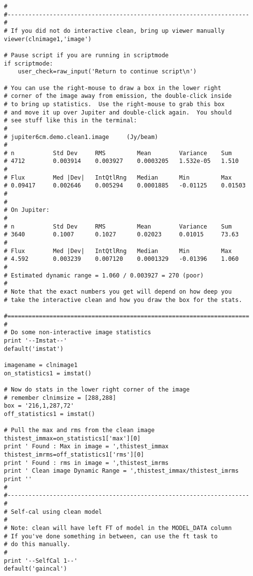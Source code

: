 \begin{verbatim}
#
#---------------------------------------------------------------------
#
# If you did not do interactive clean, bring up viewer manually
viewer(clnimage1,'image')

# Pause script if you are running in scriptmode
if scriptmode:
    user_check=raw_input('Return to continue script\n')

# You can use the right-mouse to draw a box in the lower right
# corner of the image away from emission, the double-click inside
# to bring up statistics.  Use the right-mouse to grab this box
# and move it up over Jupiter and double-click again.  You should
# see stuff like this in the terminal:
#
# jupiter6cm.demo.clean1.image     (Jy/beam)
# 
# n           Std Dev     RMS         Mean        Variance    Sum
# 4712        0.003914    0.003927    0.0003205   1.532e-05   1.510     
# 
# Flux        Med |Dev|   IntQtlRng   Median      Min         Max
# 0.09417     0.002646    0.005294    0.0001885   -0.01125    0.01503   
#
#
# On Jupiter:
#
# n           Std Dev     RMS         Mean        Variance    Sum
# 3640        0.1007      0.1027      0.02023     0.01015     73.63     
# 
# Flux        Med |Dev|   IntQtlRng   Median      Min         Max
# 4.592       0.003239    0.007120    0.0001329   -0.01396    1.060     
#
# Estimated dynamic range = 1.060 / 0.003927 = 270 (poor)
#
# Note that the exact numbers you get will depend on how deep you
# take the interactive clean and how you draw the box for the stats.

#=====================================================================
#
# Do some non-interactive image statistics
print '--Imstat--'
default('imstat')

imagename = clnimage1
on_statistics1 = imstat()

# Now do stats in the lower right corner of the image
# remember clnimsize = [288,288]
box = '216,1,287,72'
off_statistics1 = imstat()

# Pull the max and rms from the clean image
thistest_immax=on_statistics1['max'][0]
print ' Found : Max in image = ',thistest_immax
thistest_imrms=off_statistics1['rms'][0]
print ' Found : rms in image = ',thistest_imrms
print ' Clean image Dynamic Range = ',thistest_immax/thistest_imrms
print ''
#
#---------------------------------------------------------------------
#
# Self-cal using clean model
#
# Note: clean will have left FT of model in the MODEL_DATA column
# If you've done something in between, can use the ft task to
# do this manually.
#
print '--SelfCal 1--'
default('gaincal')


\end{verbatim}
